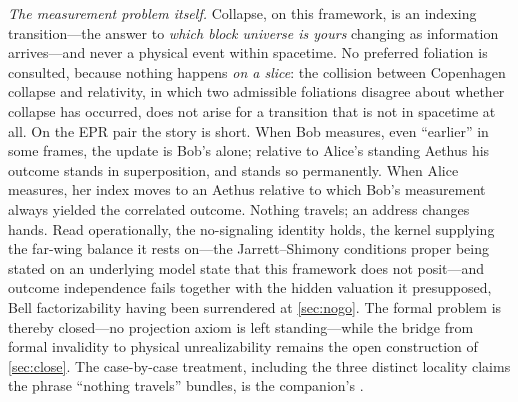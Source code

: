 \documentclass[11pt]{article}
\theoremstyle{definition}
\newcommand{\Aethus}{Aethus}
\begin{document}
\emph{The measurement problem itself.} Collapse, on this framework, is an indexing transition---the answer to \emph{which block universe is yours} changing as information arrives---and never a physical event within spacetime. No preferred foliation is consulted, because nothing happens \emph{on a slice}: the collision between Copenhagen collapse and relativity, in which two admissible foliations disagree about whether collapse has occurred, does not arise for a transition that is not in spacetime at all. On the EPR pair \cite{epr1935} the story is short. When Bob measures, even ``earlier'' in some frames, the update is Bob's alone; relative to Alice's standing \Aethus{} his outcome stands in superposition, and stands so permanently. When Alice measures, her index moves to an \Aethus{} relative to which Bob's measurement always yielded the correlated outcome. Nothing travels; an address changes hands. Read operationally, the no-signaling identity holds, the kernel supplying the far-wing balance it rests on---the Jarrett--Shimony conditions proper being stated on an underlying model state that this framework does not posit---and outcome independence fails together with the hidden valuation it presupposed, Bell factorizability having been surrendered at \autoref{sec:nogo}. The formal problem is thereby closed---no projection axiom is left standing---while the bridge from formal invalidity to physical unrealizability remains the open construction of \autoref{sec:close}. The case-by-case treatment, including the three distinct locality claims the phrase ``nothing travels'' bundles, is the companion's \cite{AethusRealist}.
\end{document}
